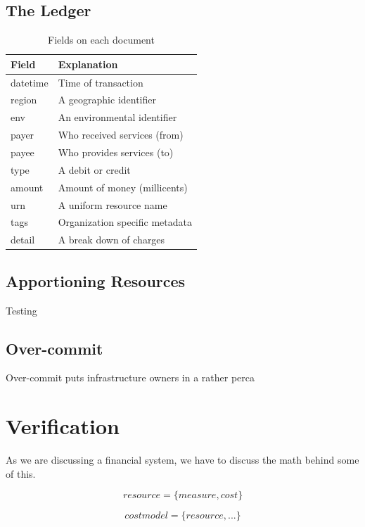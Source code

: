\documentclass[10pt, a4paper, twocolumn]{article}
\begin{document}
  \subsection*{The Ledger}

    \begin{table}[H]
      \centering
      \begin{tabular}{ l|l }
        Field & Explanation \\
        \hline
        datetime & Time of transaction \\
        region & A geographic identifier \\
        env & An environmental identifier \\
        payer & Who received services (from) \\
        payee & Who provides services (to) \\
        type & A debit or credit \\
        amount & Amount of money (millicents) \\
        urn & A uniform resource name \\
        tags & Organization specific metadata \\
        detail & A break down of charges
      \end{tabular}
      \caption{Fields on each document}
      \label{table:1}
    \end{table}


  \subsection*{Apportioning Resources}

    Testing

  \subsection*{Over-commit}

    Over-commit puts infrastructure owners in a rather perca


\section*{Verification}

  As we are discussing a financial system, we have to discuss the math behind some of this.

  \[ resource = \{ measure, cost \} \]

  \[ costmodel = \{ resource, ... \} \]
\end{document}
